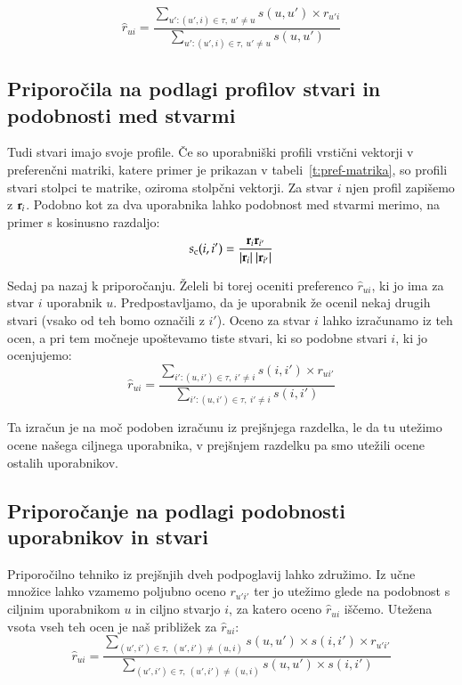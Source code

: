 \begin{equation}
\hat{r}_{ui} = \frac{\displaystyle\sum_{u':(u',i)\in\tau,\ u'\neq u}s(u,
  u')\times r_{u'i}}{\displaystyle\sum_{u':(u',i)\in\tau,\ u'\neq u}s(u, u')}
\end{equation}

\subsection{Priporočila na podlagi profilov stvari in podobnosti med stvarmi}

Tudi stvari imajo svoje profile. Če so uporabniški profili vrstični vektorji v preferenčni matriki, katere primer je prikazan v tabeli~\ref{t:pref-matrika}, so profili stvari stolpci te matrike, oziroma stolpčni vektorji. Za stvar $i$ njen profil zapišemo z ${\bf r}_i$. Podobno kot za dva uporabnika lahko podobnost med stvarmi merimo, na primer s kosinusno razdaljo:
%
$$ s_{\rm c}(i,i')={{\bf r}_i {\bf r}_{i'} \over |{\bf r}_i|\ |{\bf r}_{i'}|}$$
%

Sedaj pa nazaj k priporočanju. Želeli bi torej oceniti preferenco $\hat{r}_{ui}$, ki jo ima za stvar $i$ uporabnik $u$. Predpostavljamo, da je uporabnik že ocenil nekaj drugih stvari (vsako od teh bomo označili z $i'$). Oceno za stvar $i$ lahko izračunamo iz teh ocen, a pri tem močneje upoštevamo tiste stvari, ki so podobne stvari $i$, ki jo ocenjujemo:
%
\begin{equation}
\hat{r}_{ui} = \frac{\displaystyle\sum_{i':(u,i')\in\tau,\ i'\neq i}s(i,
  i')\times r_{ui'}}{\displaystyle\sum_{i':(u,i')\in\tau,\ i'\neq i}s(i, i')}
\end{equation}

Ta izračun je na moč podoben izračunu iz prejšnjega razdelka, le da tu utežimo ocene našega ciljnega uporabnika, v prejšnjem razdelku pa smo utežili ocene ostalih uporabnikov.

\subsection{Priporočanje na podlagi podobnosti uporabnikov in stvari}

Priporočilno tehniko iz prejšnjih dveh podpoglavij lahko združimo. Iz učne množice lahko vzamemo poljubno oceno $r_{u'i'}$ ter jo utežimo glede na podobnost s ciljnim uporabnikom $u$ in ciljno stvarjo $i$, za katero oceno $\hat{r}_{ui}$ iščemo. Utežena vsota vseh teh ocen je naš približek za $\hat{r}_{ui}$:
%
\begin{equation}
\hat{r}_{ui} = \frac{\displaystyle\sum_{(u',i')\in\tau,\ (u',i')\neq (u,i)}s(u,u')\times s(i, i')\times r_{u'i'}}{\displaystyle\sum_{(u',i')\in\tau,\ (u',i')\neq (u,i)}s(u,u')\times s(i, i')}
\end{equation}

